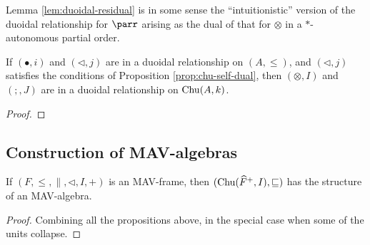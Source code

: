 \begin{remark}
  Lemma \ref{lem:duoidal-residual} is in some sense the
  ``intuitionistic'' version of the duoidal relationship for $\parr$
  arising as the dual of that for $\otimes$ in a $*$-autonomous
  partial order.
\end{remark}

\begin{proposition}
  If $(\bullet, i)$ and $(\lhd, j)$ are in a duoidal relationship on
  $(A, \leq)$, and $(\lhd, j)$ satisfies the conditions of Proposition
  \ref{prop:chu-self-dual}, then $(\otimes, I)$ and $(;, J)$ are in a
  duoidal relationship on $\mathrm{Chu}(A, k)$.
\end{proposition}

\begin{proof}
\end{proof}

\subsection{Construction of MAV-algebras}

\begin{theorem}
  If $(F, \leq, \parallel, \lhd, I, +)$ is an MAV-frame, then
  $(\mathrm{Chu}(\widehat{F}^+, I), \sqsubseteq)$ has the structure of an
  MAV-algebra.
\end{theorem}

\begin{proof}
  Combining all the propositions above, in the special case when some
  of the units collapse.
\end{proof}
